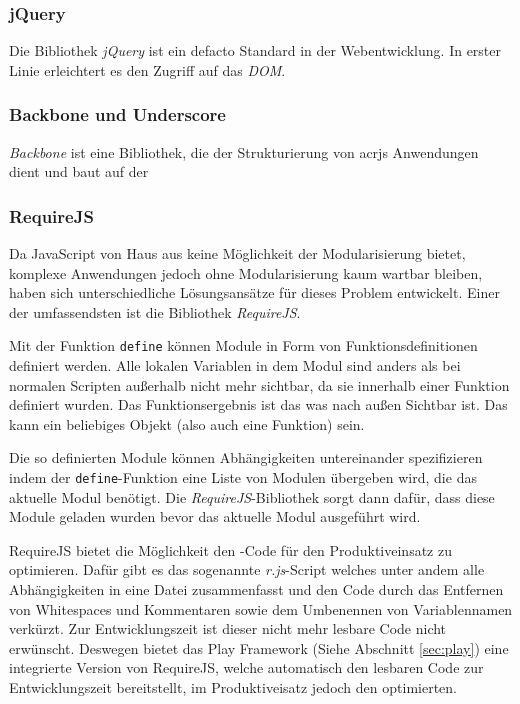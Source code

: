 \subsubsection{jQuery}

Die Bibliothek \textit{jQuery} ist ein defacto Standard in der Webentwicklung.  In erster Linie
erleichtert es den Zugriff auf das \textit{DOM}. 

\subsubsection{Backbone und Underscore}

\textit{Backbone} ist eine Bibliothek, die der Strukturierung von acr{js} Anwendungen dient und baut
auf der 

\subsubsection{RequireJS}
\label{sec:requirejs}

Da JavaScript von Haus aus keine Möglichkeit der Modularisierung bietet, komplexe Anwendungen
jedoch ohne Modularisierung kaum wartbar bleiben, haben sich unterschiedliche Lösungsansätze für
dieses Problem entwickelt. Einer der  umfassendsten ist die Bibliothek \textit{RequireJS}.

Mit der Funktion \texttt{define} können Module in Form von Funktionsdefinitionen  definiert werden.
Alle lokalen Variablen in dem Modul sind anders als bei  normalen Scripten außerhalb nicht mehr
sichtbar, da sie innerhalb einer  Funktion definiert wurden. Das Funktionsergebnis ist das was nach
außen Sichtbar  ist. Das kann ein beliebiges Objekt (also auch eine Funktion) sein.

Die so definierten Module können Abhängigkeiten untereinander spezifizieren  indem der
\texttt{define}-Funktion eine Liste von Modulen übergeben wird, die  das aktuelle Modul benötigt.
Die \textit{RequireJS}-Bibliothek sorgt dann dafür,  dass diese Module geladen wurden bevor das
aktuelle Modul ausgeführt wird.

RequireJS bietet die Möglichkeit den  -Code für den Produktiveinsatz zu optimieren. Dafür
gibt es  das sogenannte \textit{r.js}-Script welches unter andem alle Abhängigkeiten in eine Datei
zusammenfasst und den Code durch das Entfernen von Whitespaces und Kommentaren  sowie dem Umbenennen
von Variablennamen verkürzt. Zur Entwicklungszeit ist dieser nicht mehr lesbare Code nicht
erwünscht. Deswegen bietet das Play Framework (Siehe Abschnitt \ref{sec:play}) eine integrierte
Version von RequireJS, welche automatisch den lesbaren Code zur Entwicklungszeit  bereitstellt, im
Produktiveisatz jedoch den optimierten.
